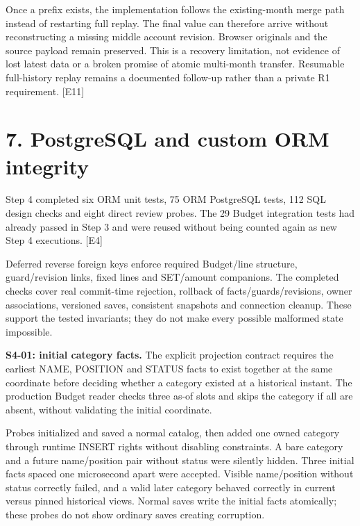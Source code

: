 \documentclass[11pt,a4paper]{article}
\begin{document}
Once a prefix exists, the implementation follows the existing-month merge path instead of restarting full replay. The final value can therefore arrive without reconstructing a missing middle account revision. Browser originals and the source payload remain preserved. This is a recovery limitation, not evidence of lost latest data or a broken promise of atomic multi-month transfer. Resumable full-history replay remains a documented follow-up rather than a private R1 requirement. [E11]

\section*{7. PostgreSQL and custom ORM integrity}

Step 4 completed six ORM unit tests, 75 ORM PostgreSQL tests, 112 SQL design checks and eight direct review probes. The 29 Budget integration tests had already passed in Step 3 and were reused without being counted again as new Step 4 executions. [E4]

Deferred reverse foreign keys enforce required Budget/\allowbreak{}line structure, guard/\allowbreak{}revision links, fixed lines and SET/\allowbreak{}amount companions. The completed checks cover real commit-time rejection, rollback of facts/\allowbreak{}guards/\allowbreak{}revisions, owner associations, versioned saves, consistent snapshots and connection cleanup. These support the tested invariants; they do not make every possible malformed state impossible.

\textbf{S4-01: initial category facts.} The explicit projection contract requires the earliest NAME, POSITION and STATUS facts to exist together at the same coordinate before deciding whether a category existed at a historical instant. The production Budget reader checks three as-of slots and skips the category if all are absent, without validating the initial coordinate.

Probes initialized and saved a normal catalog, then added one owned category through runtime INSERT rights without disabling constraints. A bare category and a future name/\allowbreak{}position pair without status were silently hidden. Three initial facts spaced one microsecond apart were accepted. Visible name/\allowbreak{}position without status correctly failed, and a valid later category behaved correctly in current versus pinned historical views. Normal saves write the initial facts atomically; these probes do not show ordinary saves creating corruption.
\end{document}
